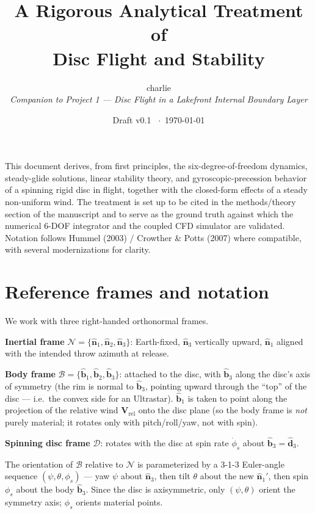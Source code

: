 \documentclass[11pt,letterpaper]{article}
\title{\bfseries A Rigorous Analytical Treatment of\\Disc Flight and Stability}
\author{charlie\\\small\textit{Companion to Project 1 --- Disc Flight in a Lakefront Internal Boundary Layer}}
\date{Draft v0.1 \ $\cdot$\ \today}
\begin{document}
\maketitle

\noindent This document derives, from first principles, the six-degree-of-freedom dynamics, steady-glide solutions, linear stability theory, and gyroscopic-precession behavior of a spinning rigid disc in flight, together with the closed-form effects of a steady non-uniform wind. The treatment is set up to be cited in the methods/theory section of the manuscript and to serve as the ground truth against which the numerical 6-DOF integrator and the coupled CFD simulator are validated. Notation follows Hummel (2003) / Crowther \& Potts (2007) where compatible, with several modernizations for clarity.

\section{Reference frames and notation}

We work with three right-handed orthonormal frames.

\textbf{Inertial frame} $\mathcal{N} = \{\hat{\mathbf{n}}_1, \hat{\mathbf{n}}_2, \hat{\mathbf{n}}_3\}$: Earth-fixed, $\hat{\mathbf{n}}_3$ vertically upward, $\hat{\mathbf{n}}_1$ aligned with the intended throw azimuth at release.

\textbf{Body frame} $\mathcal{B} = \{\hat{\mathbf{b}}_1, \hat{\mathbf{b}}_2, \hat{\mathbf{b}}_3\}$: attached to the disc, with $\hat{\mathbf{b}}_3$ along the disc's axis of symmetry (the rim is normal to $\hat{\mathbf{b}}_3$, pointing upward through the ``top'' of the disc --- i.e.\ the convex side for an Ultrastar). $\hat{\mathbf{b}}_1$ is taken to point along the projection of the relative wind $\mathbf{V}_{\text{rel}}$ onto the disc plane (so the body frame is \emph{not} purely material; it rotates only with pitch/roll/yaw, not with spin).

\textbf{Spinning disc frame} $\mathcal{D}$: rotates with the disc at spin rate $\dot{\phi}_s$ about $\hat{\mathbf{b}}_3 = \hat{\mathbf{d}}_3$.

The orientation of $\mathcal{B}$ relative to $\mathcal{N}$ is parameterized by a 3-1-3 Euler-angle sequence $(\psi, \theta, \phi_s)$ --- yaw $\psi$ about $\hat{\mathbf{n}}_3$, then tilt $\theta$ about the new $\hat{\mathbf{n}}_1'$, then spin $\phi_s$ about the body $\hat{\mathbf{b}}_3$. Since the disc is axisymmetric, only $(\psi, \theta)$ orient the symmetry axis; $\phi_s$ orients material points.
\end{document}
